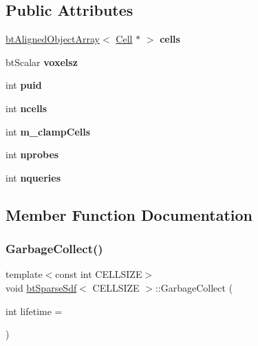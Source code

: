\subsection*{Public Attributes}
\begin{DoxyCompactItemize}
\item 
\mbox{\label{structbtSparseSdf_a96994688745162aae2fbaa80987b82f6}} 
\hyperlink{classbtAlignedObjectArray}{bt\+Aligned\+Object\+Array}$<$ \hyperlink{structbtSparseSdf_1_1Cell}{Cell} $\ast$ $>$ {\bfseries cells}
\item 
\mbox{\label{structbtSparseSdf_af08d0b4463c5dd5dffddb172b2095705}} 
bt\+Scalar {\bfseries voxelsz}
\item 
\mbox{\label{structbtSparseSdf_aff0dcb600fe35b805e95f48d205ab17b}} 
int {\bfseries puid}
\item 
\mbox{\label{structbtSparseSdf_a04622e2f419471b6976d817e8a7327e7}} 
int {\bfseries ncells}
\item 
\mbox{\label{structbtSparseSdf_a8bca9c6ebbe23a19d02127a81260dc55}} 
int {\bfseries m\+\_\+clamp\+Cells}
\item 
\mbox{\label{structbtSparseSdf_a937be99aca40d5cbedf8357a21ab765d}} 
int {\bfseries nprobes}
\item 
\mbox{\label{structbtSparseSdf_ac5a660d252157f0cd9de683951921bc0}} 
int {\bfseries nqueries}
\end{DoxyCompactItemize}


\subsection{Member Function Documentation}
\mbox{\label{structbtSparseSdf_a08dbaa356f577ebbd0808329766111d1}} 
\subsubsection{\texorpdfstring{Garbage\+Collect()}{GarbageCollect()}}
{\footnotesize\ttfamily template$<$const int C\+E\+L\+L\+S\+I\+ZE$>$ \\
void \hyperlink{structbtSparseSdf}{bt\+Sparse\+Sdf}$<$ C\+E\+L\+L\+S\+I\+ZE $>$\+::Garbage\+Collect (\begin{DoxyParamCaption}\item[{int}]{lifetime = {} }\end{DoxyParamCaption})\hspace{0.3cm}{\ttfamily [inline]}}

